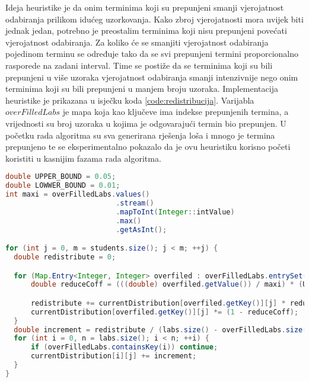 \documentclass[times, utf8, zavrsni]{fer}
\begin{document}
Ideja heuristike je da onim terminima koji su prepunjeni smanji
vjerojatnost odabiranja prilikom idućeg uzorkovanja. Kako zbroj vjerojatnosti mora uvijek biti jednak jedan, potrebno je
preostalim terminima koji nisu prepunjeni povećati vjerojatnost odabiranja. Za koliko će se smanjiti vjerojatnost odabiranja
pojedinom terminu se određuje tako da se svi prepunjeni termini proporcionalno rasporede na zadani interval. Time se postiže da se terminima
koji su bili prepunjeni u više uzoraka vjerojatnost odabiranja smanji intenzivnije nego onim terminima koji su bili prepunjeni
u manjem broju uzoraka. Implementacija heuristike je prikazana u isječku koda \ref{code:redistribucija}. Varijabla
$overFilledLabs$ je mapa koja kao ključeve ima indekse prepunjenih termina, a vrijednosti su broj uzoraka u kojima
je odgovarajući termin bio prepunjen. U početku rada algoritma
su sva generirana rješenja loša i mnogo je termina prepunjeno te se eksperimentalno pokazalo da je ovu heuristiku korisno početi koristiti u
kasnijim fazama rada algoritma.

\begin{lstlisting}[caption={Redistribucija vjerojatnosti prepunjenih termina},label=code:redistribucija, language=Java]
double UPPER_BOUND = 0.05;
double LOWWER_BOUND = 0.01;
int maxi = overFilledLabs.values()
                          .stream()
                          .mapToInt(Integer::intValue)
                          .max()
                          .getAsInt();

for (int j = 0, m = students.size(); j < m; ++j) {
  double redistribute = 0;

  for (Map.Entry<Integer, Integer> overfiled : overFilledLabs.entrySet()) {
      double reduceCoff = (((double) overfiled.getValue()) / maxi) * (UPPER_BOUND - LOWWER_BOUND) + LOWWER_BOUND;

      redistribute += currentDistribution[overfiled.getKey()][j] * reduceCoff;
      currentDistribution[overfiled.getKey()][j] *= (1 - reduceCoff);
  }
  double increment = redistribute / (labs.size() - overFilledLabs.size());
  for (int i = 0, n = labs.size(); i < n; ++i) {
      if (overFilledLabs.containsKey(i)) continue;
      currentDistribution[i][j] += increment;
  }
}
\end{lstlisting}
\end{document}
